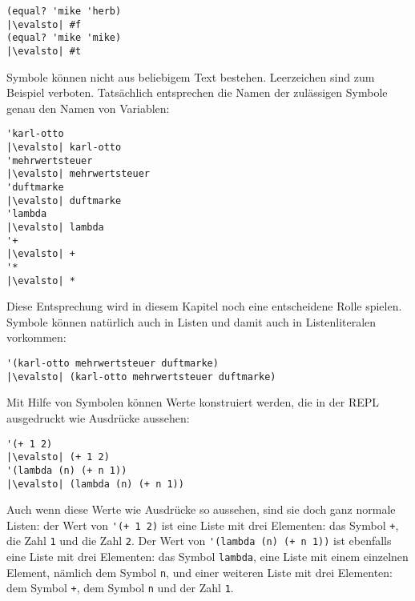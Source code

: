 \begin{lstlisting}
(equal? 'mike 'herb)
|\evalsto| #f
(equal? 'mike 'mike)
|\evalsto| #t
\end{lstlisting}
%
Symbole können nicht aus beliebigem Text bestehen.  
Leerzeichen sind zum Beispiel verboten.  Tatsächlich entsprechen die
Namen der zulässigen Symbole genau den Namen von Variablen:
%
\begin{lstlisting}
'karl-otto
|\evalsto| karl-otto
'mehrwertsteuer
|\evalsto| mehrwertsteuer
'duftmarke
|\evalsto| duftmarke
'lambda
|\evalsto| lambda
'+
|\evalsto| +
'*
|\evalsto| *
\end{lstlisting}
%
Diese Entsprechung wird in diesem Kapitel noch eine entscheidene Rolle
spielen.  Symbole können natürlich auch in Listen und damit auch in
Listenliteralen vorkommen:
%
\begin{lstlisting}
'(karl-otto mehrwertsteuer duftmarke)
|\evalsto| (karl-otto mehrwertsteuer duftmarke)
\end{lstlisting}
%
Mit Hilfe von Symbolen können Werte konstruiert werden, die in der REPL
ausgedruckt wie Ausdrücke aussehen:
%
\begin{lstlisting}
'(+ 1 2)
|\evalsto| (+ 1 2)
'(lambda (n) (+ n 1))
|\evalsto| (lambda (n) (+ n 1))
\end{lstlisting}
%
Auch wenn diese Werte wie Ausdrücke so aussehen, sind sie doch ganz
normale Listen: der Wert von \verb|'(+ 1 2)| ist eine Liste mit drei
Elementen: das Symbol \verb|+|, die Zahl \lstinline{1} und die Zahl
\lstinline{2}.  Der Wert von \verb|'(lambda (n) (+ n 1))| ist ebenfalls
eine Liste mit drei Elementen: das Symbol \verb|lambda|, eine Liste
mit einem einzelnen Element, nämlich dem Symbol \lstinline{n}, und einer
weiteren Liste mit drei Elementen: dem Symbol \lstinline{+}, dem Symbol
\lstinline{n} und der Zahl \lstinline{1}.

